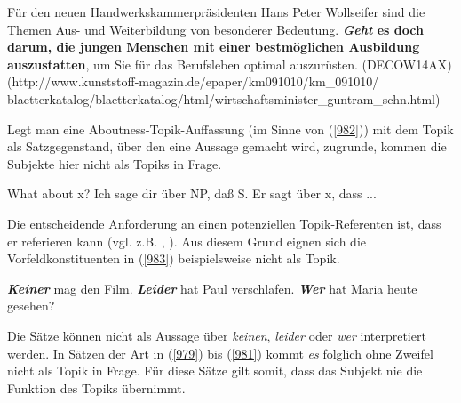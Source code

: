 {\begin{exe}
	\ex\label{981}
	\scriptsize
	Für den neuen Handwerkskammerpräsidenten Hans Peter Wollseifer sind die Themen Aus- und Wei\-terbildung von besonderer Bedeutung.
	\textbf{\textit{Geht} es \underline{doch} darum, die jungen Menschen mit einer bestmöglichen Ausbildung auszustatten}, um Sie für das Berufsleben 			optimal auszurüsten.
	\hfill\hbox{(DECOW14AX)}
	\newline
	\hbox{}\hfill\hbox{(http://www.kunststoff-magazin.de/epaper/km091010/km\_091010/}
	\newline
	\hbox{}\hfill\hbox{blaetterkatalog/blaetterkatalog/html/wirtschaftsminister\_guntram\_schn.html)}
\end{exe}
Legt man eine  Aboutness-Topik-Auffassung (im Sinne von (\ref{982})) mit dem Topik als Satzgegenstand, über den eine Aussage gemacht wird, zugrunde, kommen die Subjekte hier nicht als Topiks in Frage.

\begin{exe}
	\ex\label{982} 
		\begin{xlist}	
			\ex\label{982a} What about x?
			\hfill\hbox {\citet[32]{Gundel1977}}
			\ex\label{982b} Ich sage dir über NP, daß S.
			\hfill\hbox {\citet[68-69]{Sgall1974}}
			\ex\label{982c} Er sagt über x, dass ...
			\hfill\hbox {\citet[65]{Reinhart1981}}
		\end{xlist}
\end{exe}
Die entscheidende Anforderung an einen potenziellen Topik-Referenten  ist, dass er referieren kann (vgl. z.B. \citealt{Reinhart1981}, \citealt[331]{Frey2007}). Aus diesem Grund eignen sich die Vorfeldkonstituenten in (\ref{983}) beispielsweise nicht als Topik.

\begin{exe}
	\ex\label{983} 
		\begin{xlist}	
			\ex\label{983a} \textbf{\textit{Keiner}} mag den Film.
			\ex\label{983b} \textbf{\textit{Leider}} hat Paul verschlafen.
			\ex\label{983c} \textbf{\textit{Wer}} hat Maria heute gesehen?
			\hfill\hbox {\citet[331]{Frey2007}}
		\end{xlist}
\end{exe}
Die Sätze können nicht als Aussage über \textit{keinen}, \textit{leider} oder \textit{wer} interpretiert werden. In Sätzen der Art in (\ref{979}) bis (\ref{981}) kommt \textit{es} folglich ohne Zweifel nicht als Topik in Frage. Für diese Sätze gilt somit, dass das Subjekt nie die Funktion des Topiks übernimmt.

}
